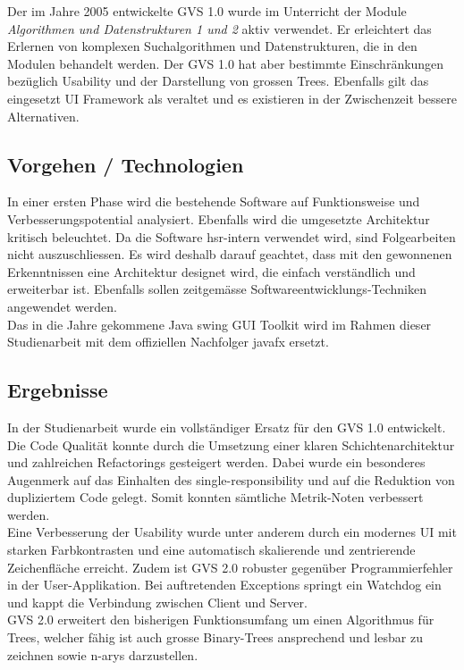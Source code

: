\documentclass[11pt,a4paper,english,oneside]{book}
\numberwithin{equation}{chapter}
\begin{document}
	\noindent
	Der im Jahre 2005 entwickelte GVS 1.0 wurde im Unterricht der Module \textit{Algorithmen und Datenstrukturen 1 und 2} aktiv verwendet. Er erleichtert das Erlernen von komplexen Suchalgorithmen und Datenstrukturen, die in den Modulen behandelt werden. Der GVS 1.0 hat aber bestimmte Einschränkungen bezüglich Usability und der Darstellung von grossen Trees. Ebenfalls gilt das eingesetzt UI Framework als veraltet und es existieren in der Zwischenzeit bessere Alternativen.
	
	\subsection*{Vorgehen / Technologien}	
	In einer ersten Phase wird die bestehende Software auf Funktionsweise und Verbesserungspotential analysiert. Ebenfalls wird die umgesetzte Architektur kritisch beleuchtet. Da die Software \gls{hsr}-intern verwendet wird, sind Folgearbeiten nicht auszuschliessen. Es wird deshalb darauf geachtet, dass mit den gewonnenen Erkenntnissen eine Architektur designet wird, die einfach verständlich und erweiterbar ist. Ebenfalls sollen zeitgemässe Softwareentwicklungs-Techniken angewendet werden. \\
	
	\noindent
	Das in die Jahre gekommene Java \gls{swing} GUI Toolkit wird im Rahmen dieser Studienarbeit mit dem offiziellen Nachfolger \gls{javafx} ersetzt. 
	
	\subsection*{Ergebnisse}
	In der Studienarbeit wurde ein vollständiger Ersatz für den GVS 1.0 entwickelt.\\
	Die Code Qualität konnte durch die Umsetzung einer klaren Schichtenarchitektur und zahlreichen Refactorings gesteigert werden. Dabei wurde ein besonderes Augenmerk auf das Einhalten des \gls{single-responsibility} und auf die Reduktion von dupliziertem Code gelegt. Somit konnten sämtliche Metrik-Noten verbessert werden.\\
	Eine Verbesserung der Usability wurde unter anderem durch ein modernes UI mit starken Farbkontrasten und eine automatisch skalierende und zentrierende Zeichenfläche erreicht. Zudem ist GVS 2.0 robuster gegenüber Programmierfehler in der User-Applikation. Bei auftretenden Exceptions springt ein Watchdog ein und kappt die Verbindung zwischen Client und Server.\\
	GVS 2.0 erweitert den bisherigen Funktionsumfang um einen Algorithmus für Trees, welcher fähig ist auch grosse Binary-Trees ansprechend und lesbar zu zeichnen sowie \glspl{n-ary} darzustellen.
	
\end{document}
